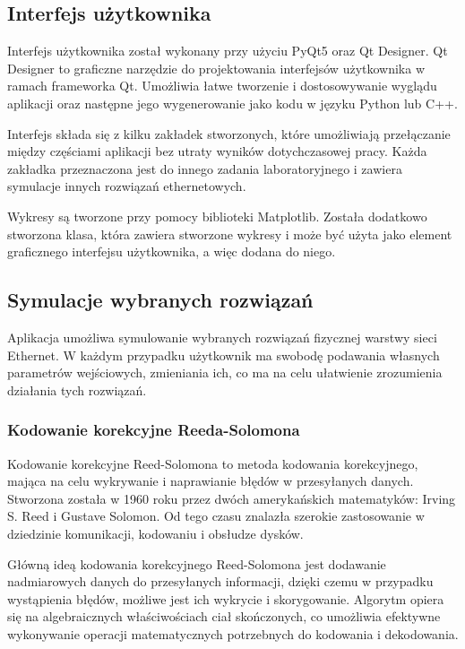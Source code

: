 \subsection{Interfejs użytkownika}\label{subsection:interfejs}
Interfejs użytkownika został wykonany przy użyciu PyQt5 oraz Qt Designer. Qt Designer to graficzne narzędzie do projektowania interfejsów użytkownika w ramach frameworka Qt. Umożliwia łatwe tworzenie i dostosowywanie wyglądu aplikacji oraz następne jego wygenerowanie jako kodu w języku Python lub C++.

Interfejs składa się z kilku zakładek stworzonych, które umożliwiają przełączanie między częściami aplikacji bez utraty wyników dotychczasowej pracy. Każda zakładka przeznaczona jest do innego zadania laboratoryjnego i zawiera symulacje innych rozwiązań ethernetowych.

Wykresy są tworzone przy pomocy biblioteki Matplotlib. Została dodatkowo stworzona klasa, która zawiera stworzone wykresy i może być użyta jako element graficznego interfejsu użytkownika, a więc dodana do niego.

\subsection{Symulacje wybranych rozwiązań}
Aplikacja umożliwa symulowanie wybranych rozwiązań fizycznej warstwy sieci Ethernet. W każdym przypadku użytkownik ma swobodę podawania własnych parametrów wejściowych, zmieniania ich, co ma na celu ułatwienie zrozumienia działania tych rozwiązań.

\subsubsection{Kodowanie korekcyjne Reeda-Solomona}
Kodowanie korekcyjne Reed-Solomona to metoda kodowania korekcyjnego, mająca na celu wykrywanie i naprawianie błędów w przesyłanych danych. Stworzona została w 1960 roku przez dwóch amerykańskich matematyków: Irving S. Reed i Gustave Solomon. Od tego czasu znalazła szerokie zastosowanie w dziedzinie komunikacji, kodowaniu i obsłudze dysków.

Główną ideą kodowania korekcyjnego Reed-Solomona jest dodawanie nadmiarowych danych do przesyłanych informacji, dzięki czemu w przypadku wystąpienia błędów, możliwe jest ich wykrycie i skorygowanie. Algorytm opiera się na algebraicznych właściwościach ciał skończonych, co umożliwia efektywne wykonywanie operacji matematycznych potrzebnych do kodowania i dekodowania.

